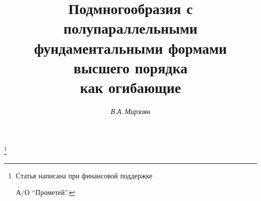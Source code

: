 

 










\newcommand{\tri}{\dotsb\dotsb\dotsb} 


\newcommand{\tts}[1]{} 


 




  


\setcounter{page}{79} 












\author{\it В.А.\,Мирзоян} 




\title{ Подмногообразия с полупараллельными \\ 


фундаментальными формами высшего порядка \\


как огибающие} 


 


\thanks{Статья написана при финансовой поддержке 


А/О ``Прометей''.} 


\date{} 




 


\pagestyle{plain} %


